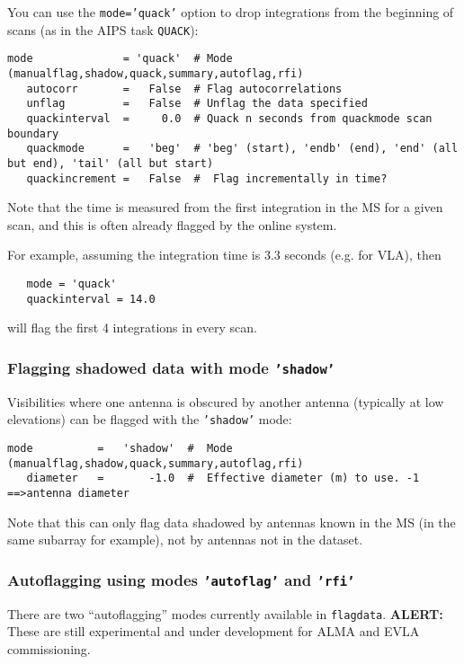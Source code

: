 You can use the {\tt mode='quack'} option to drop integrations from
the beginning of scans (as in the AIPS task {\tt QUACK}):
\small
\begin{verbatim}
mode              = 'quack'  # Mode (manualflag,shadow,quack,summary,autoflag,rfi)
   autocorr       =   False  # Flag autocorrelations
   unflag         =   False  # Unflag the data specified
   quackinterval  =     0.0  # Quack n seconds from quackmode scan boundary
   quackmode      =   'beg'  # 'beg' (start), 'endb' (end), 'end' (all but end), 'tail' (all but start)
   quackincrement =   False  #  Flag incrementally in time?
\end{verbatim}
\normalsize
Note that the time is measured from the first integration in the MS
for a given scan, and this is often already flagged by the online
system.

For example, assuming the integration time is 3.3 seconds (e.g. for
VLA), then
\small
\begin{verbatim}
   mode = 'quack'
   quackinterval = 14.0 
\end{verbatim}
\normalsize
will flag the first 4 integrations in every scan.

\subsubsection{Flagging shadowed data with mode {\tt 'shadow'} }
\label{section:edit.flagdata.shadow}

Visibilities where one antenna is obscured by another antenna
(typically at low elevations) can be flagged with the {\tt 'shadow'}
mode:
\small
\begin{verbatim}
mode          =   'shadow'  #  Mode (manualflag,shadow,quack,summary,autoflag,rfi)
   diameter   =       -1.0  #  Effective diameter (m) to use. -1 ==>antenna diameter
\end{verbatim}
\normalsize
Note that this can only flag data shadowed by antennas known in the MS
(in the same subarray for example), not by antennas not in the dataset.

\subsubsection{Autoflagging using modes {\tt 'autoflag'} and {\tt 'rfi'}}
\label{section:edit.flagdata.autoflag}

There are two ``autoflagging'' modes currently available in {\tt flagdata}.
{\bf ALERT:} These are still experimental and under development for
ALMA and EVLA commissioning.

